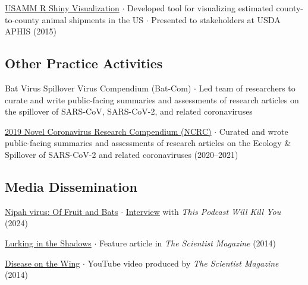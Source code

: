 \documentclass{cv}
\begin{document}
\href{https://usamm-gen-net.shinyapps.io/usamm-gen-net/}{USAMM R Shiny Visualization} $\cdot$ Developed tool for visualizing estimated county-to-county animal shipments in the US $\cdot$ Presented to stakeholders at USDA APHIS (2015)

\subsection*{Other Practice Activities}

Bat Virus Spillover Virus Compendium (Bat-Com) $\cdot$ Led team of researchers to curate and write public-facing summaries and assessments of research articles on the spillover of SARS-CoV, SARS-CoV-2, and related coronaviruses

\href{https://ncrc.jhsph.edu/}{2019 Novel Coronavirus Research Compendium (NCRC)} $\cdot$ Curated and wrote public-facing summaries and assessments of research articles on the Ecology \& Spillover of SARS-CoV-2 and related coronaviruses (2020--2021)

\subsection*{Media Dissemination}



\href{https://thispodcastwillkillyou.com/2024/05/21/episode-140-nipah-virus-of-fruit-and-bats/}{Nipah virus: Of Fruit and Bats} $\cdot$ \href{https://open.spotify.com/episode/3bF2bICaa7Ipq7s6EzCUKj?si=456f659ff8874de5}{Interview} with \textit{This Podcast Will Kill You} (2024)

\href{https://www.the-scientist.com/features/lurking-in-the-shadows-36302}{Lurking in the Shadows} $\cdot$ Feature article in \textit{The Scientist Magazine} (2014)

\href{https://youtu.be/p6I0kRVGyo4}{Disease on the Wing} $\cdot$ YouTube video produced by \textit{The Scientist Magazine} (2014)

\end{document}

